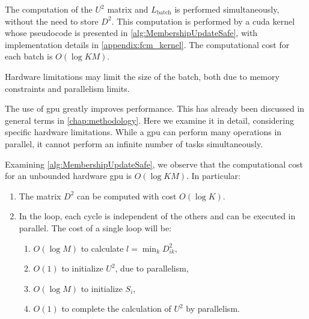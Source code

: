 \begin{toReview}
	\noindent The computation of the $U^2$ matrix and $L_\text{batch}$ is performed simultaneously, without the need to store $D^2$. This computation is performed by a \gls{cuda} kernel whose pseudocode is presented in \cref{alg:MembershipUpdateSafe}, with implementation details in \cref{appendix:fcm_kernel}. The computational cost for each batch is $O(\log KM)$.

	\bigskip\noindent Hardware limitations may limit the size of the batch, both due to memory constraints and parallelism limits.

	\noindent The use of \gls{gpu} greatly improves performance. This has already been discussed in general terms in \cref{chap:methodology}. Here we examine it in detail, considering specific hardware limitations. While a \gls{gpu} can perform many operations in parallel, it cannot perform an infinite number of tasks simultaneously.

	\bigskip \noindent Examining \cref{alg:MembershipUpdateSafe}, we observe that the computational cost for an unbounded hardware \gls{gpu} is $O(\log KM)$. In particular:
	\begin{enumerate}
		\item The matrix $D^2$ can be computed with cost $O\left(\log K\right)$.
		\item In the loop, each cycle is independent of the others and can be executed in parallel. The cost of a single loop will be:
		\begin{enumerate}
			\item $O\left(\log M\right)$ to calculate $l = \min_k{D_{ik}^2}$,
			\item $O\left(1\right)$ to initialize $U^2$, due to parallelism,
			\item $O\left(\log M\right)$ to initialize $S_i$, \item $O\left(1\right)$ to complete the calculation of $U^2$ by parallelism.
		\end{enumerate}
	\end{enumerate}


\end{toReview}
